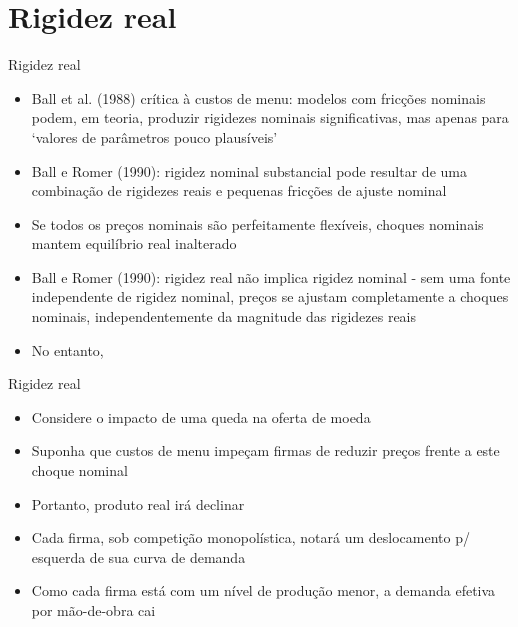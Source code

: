\documentclass[10pt]{beamer}
\begin{document}
\section{Rigidez real}
\begin{frame}{Rigidez real}
    \begin{itemize}
        \item Ball et al. (1988) crítica à custos de menu: modelos com fricções nominais podem, em teoria, produzir rigidezes nominais significativas, mas apenas para `valores de parâmetros pouco plausíveis'\bigskip
        \item Ball e Romer (1990): rigidez nominal substancial pode resultar de uma combinação de rigidezes reais e pequenas fricções de ajuste nominal\bigskip
        \item Se todos os preços nominais são perfeitamente flexíveis, choques nominais mantem equilíbrio real inalterado\bigskip
        \item Ball e Romer (1990): rigidez real não implica rigidez nominal - sem uma fonte independente de rigidez nominal, preços se ajustam completamente a choques nominais, independentemente da magnitude das rigidezes reais\bigskip
        \item No entanto, 
    \end{itemize}
\end{frame}

\begin{frame}{Rigidez real}
    \begin{itemize}
        \item Considere o impacto de uma queda na oferta de moeda\bigskip
        \item Suponha que custos de menu impeçam firmas de reduzir preços frente a este choque nominal\bigskip
        \item Portanto, produto real irá declinar\bigskip
        \item Cada firma, sob competição monopolística, notará um deslocamento p/ esquerda de sua curva de demanda\bigskip
        \item Como cada firma está com um nível de produção menor, a demanda efetiva por mão-de-obra cai
    \end{itemize}
\end{frame}
\end{document}
